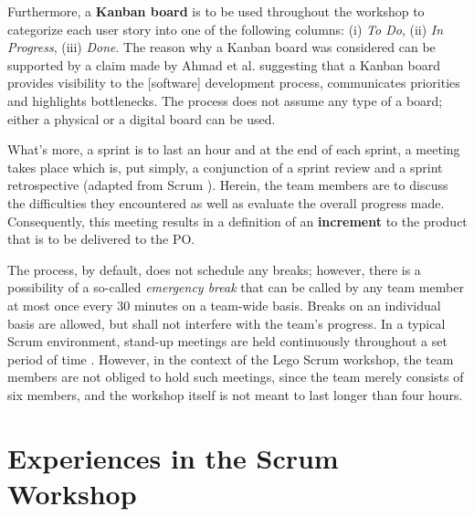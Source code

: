\documentclass[conference]{IEEEtran}
\begin{document}
Furthermore, a \textbf{Kanban board} is to be used throughout the workshop to
categorize each user story into one of the following columns: (i) \textit{To
Do}, (ii) \textit{In Progress}, (iii) \textit{Done}. The reason why a Kanban
board was considered can be supported by a claim made by Ahmad et al.
\cite{Ahmad2014} suggesting that a Kanban board provides visibility to the
[software] development process, communicates priorities and highlights
bottlenecks. The process does not assume any type of a board; either a physical
or a digital board can be used.

What's more, a sprint is to last an hour and at the end of each sprint, a
meeting takes place which is, put simply, a conjunction of a sprint review and
a sprint retrospective (adapted from Scrum \cite{Schwaber2020}). Herein, the
team members are to discuss the difficulties they encountered as well as
evaluate the overall progress made. Consequently, this meeting results in a
definition of an \textbf{increment} to the product that is to be delivered to
the PO.

The process, by default, does not schedule any breaks; however, there is a
possibility of a so-called \textit{emergency break} that can be called by any
team member at most once every 30 minutes on a team-wide basis.
Breaks on an individual basis are allowed, but shall not interfere with the
team's progress. In a typical Scrum environment, stand-up meetings are held
continuously throughout a set period of time \cite{Schwaber2020}. However, in
the context of the Lego Scrum workshop, the team members are not obliged to
hold such meetings, since the team merely consists of six members, and the
workshop itself is not meant to last longer than four hours.


\section{Experiences in the Scrum Workshop}
\label{sec:experiences}

\end{document}
